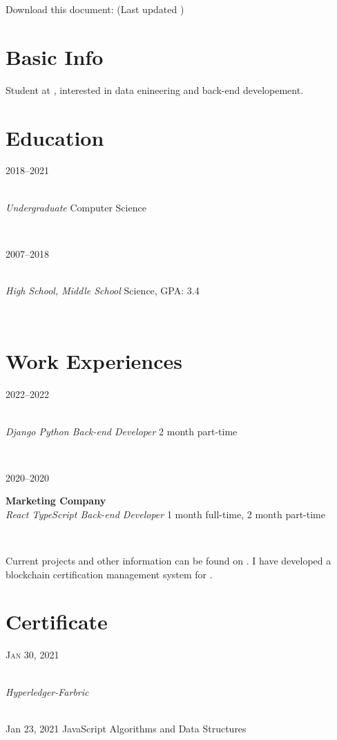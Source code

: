 \documentclass[letterpaper, 10pt]{article}
\author{Vikrom Narula}
\date{\today}
\let\oldhref\href
\renewcommand{\href}[3][blue]{\oldhref{#2}{\color{#1}{#3}}}
\renewcommand{\maketitle}{
    \hspace{.25\textwidth}
    \begin{minipage}[t]{.5\textwidth}
        \par{\centering{\Huge  \bfseries{\theauthor}}\par}
    \end{minipage}
    \begin{minipage}[t]{.25\textwidth}{
        \footnotesize\hfill{}\color{gray}
        \hfill{}Download this document:
        \hfill{}\href[gray]{https://raw.githubusercontent.com/narula2000/Resume/main/cv.pdf}{Here}
        \hfill{}(Last updated \thedate)
    }
    \end{minipage}
}
\newcommand{\entry}[4]{
    \begin{minipage}[t]{.15 \linewidth}
        \hfill \textsc{#1}
    \end{minipage}
    \hfill \vline \hfill
    \begin{minipage}[t]{.80 \linewidth}
        {\bf#2} \\ \textit{#3} \footnotesize{#4}
    \end{minipage} \\
    \vspace{.2cm}
}%
\begin{document}
\maketitle

\section{Basic Info}

Student at \href{https://muic.mahidol.ac.th/eng}{Mahidol University International College},
interested in data enineering and back-end developement. \\

\section{Education}

\entry{2018--2021}
	{\href{https://muic.mahidol.ac.th/eng}{Mahidol University International College}}
	{Undergraduate}
	{Computer Science}

\entry{2007--2018}
	{\href{https://www.repsbanchang.com}{Rayong English Programme School}}
	{High School, Middle School}
	{Science, GPA: 3.4}

\section{Work Experiences}

\entry{2022--2022}
    {\href{https://thegang.tech/?lang=en}{The Gang Technology}}
	{Django Python Back-end Developer}
	{2 month part-time}

\entry{2020--2020}
    {Marketing Company}
	{React TypeScript Back-end Developer}
	{1 month full-time, 2 month part-time}


Current projects and other information can be found on
\href{https://github.com/narula2000}{Github}.
I have developed a blockchain certification management system for
\href{https://github.com/sirinnear/AtHome-Project}{AtHome}.

\section{Certificate}

\entry{Jan 30, 2021}
    {\href{https://courses.cognitiveclass.ai/certificates/2552ddac4a7b442ba08a882913fde68e}{IBM-Blockchain}}
    {Hyperledger-Farbric}


\entry{Jan 23, 2021}
    {\href{https://freecodecamp.org/certification/fccfd875aea-9c57-4c5d-a3c3-541bdb54fdb7/javascript-algorithms-and-data-structures}{FreeCodeCamp-Javascript}}
    {JavaScript Algorithms and Data Structures}
\end{document}
